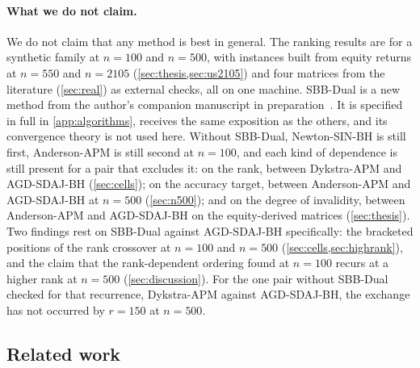 \paragraph{What we do not claim.}
We do not claim that any method is best in general. The ranking results are
for a synthetic family at $n=100$ and $n=500$, with instances built from
equity returns at $n=550$ and $n=2105$ (\cref{sec:thesis,sec:us2105}) and four
matrices from the literature (\cref{sec:real}) as external checks, all on one
machine. SBB-Dual is a new method from the author's companion manuscript in
preparation~\cite{ibrahim2026sbb}. It is specified in full in
\cref{app:algorithms}, receives the same exposition as the others, and its
convergence theory is not used here. Without SBB-Dual, Newton-SIN-BH is
still first, Anderson-APM is still second at $n=100$, and each kind of
dependence is still present for a pair that excludes it: on the rank,
between Dykstra-APM and AGD-SDAJ-BH (\cref{sec:cells}); on the accuracy
target, between Anderson-APM and AGD-SDAJ-BH at $n=500$ (\cref{sec:n500});
and on the degree of invalidity, between Anderson-APM and AGD-SDAJ-BH on the
equity-derived matrices (\cref{sec:thesis}). Two findings rest on SBB-Dual
against AGD-SDAJ-BH specifically: the bracketed positions of the rank
crossover at $n=100$ and $n=500$ (\cref{sec:cells,sec:highrank}), and the
claim that the rank-dependent ordering found at $n=100$ recurs at a higher
rank at $n=500$ (\cref{sec:discussion}). For the one pair without SBB-Dual
checked for that recurrence, Dykstra-APM against AGD-SDAJ-BH, the exchange
has not occurred by $r=150$ at $n=500$.

\subsection{Related work}\label{sec:related}

